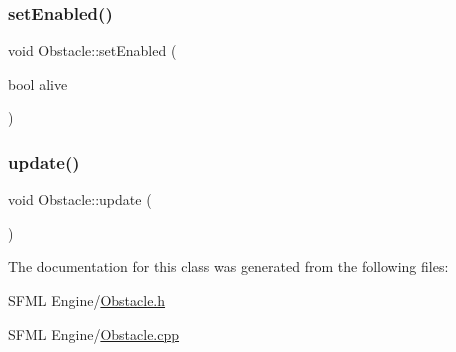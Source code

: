 \mbox{\label{class_obstacle_acce43c25bc4336bcd1d2ceb443d50a54}} 
\subsubsection{\texorpdfstring{set\+Enabled()}{setEnabled()}}
{\footnotesize\ttfamily void Obstacle\+::set\+Enabled (\begin{DoxyParamCaption}\item[{bool}]{alive }\end{DoxyParamCaption})}

\mbox{\label{class_obstacle_a3fe041a93f5b2e9e5c5750bcef2382a4}} 
\subsubsection{\texorpdfstring{update()}{update()}}
{\footnotesize\ttfamily void Obstacle\+::update (\begin{DoxyParamCaption}{ }\end{DoxyParamCaption})}



The documentation for this class was generated from the following files\+:\begin{DoxyCompactItemize}
\item 
S\+F\+M\+L Engine/\hyperlink{_obstacle_8h}{Obstacle.\+h}\item 
S\+F\+M\+L Engine/\hyperlink{_obstacle_8cpp}{Obstacle.\+cpp}\end{DoxyCompactItemize}
